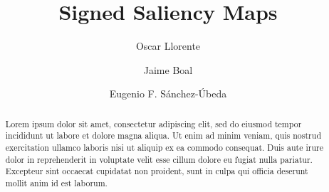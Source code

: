 \documentclass[preprint,12pt]{elsarticle}
\begin{document}
\begin{frontmatter}



\title{Signed Saliency Maps}


\author[inst1]{Oscar Llorente}


\author[inst2]{Jaime Boal}
\author[inst2]{Eugenio F. Sánchez-Úbeda}


\begin{abstract}
Lorem ipsum dolor sit amet, consectetur adipiscing elit, sed do eiusmod tempor incididunt ut labore et dolore magna aliqua. Ut enim ad minim veniam, quis nostrud exercitation ullamco laboris nisi ut aliquip ex ea commodo consequat. Duis aute irure dolor in reprehenderit in voluptate velit esse cillum dolore eu fugiat nulla pariatur. Excepteur sint occaecat cupidatat non proident, sunt in culpa qui officia deserunt mollit anim id est laborum.
\end{abstract}


\end{frontmatter}
\end{document}
